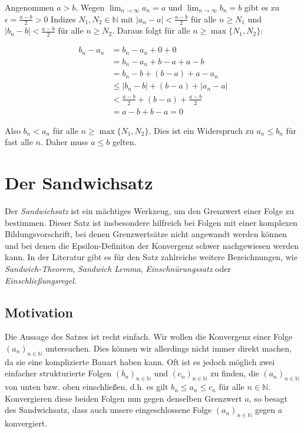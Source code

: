 \documentclass[fontsize=9pt,
               parskip=half-,
               DIV=14,
               listof=chapterentry,
               tocflat]{scrbook}
\begin{document}
\begin{proof*}
Angenommen $a>b$. Wegen $\lim _{n\to \infty }a_{n}=a$ und $\lim _{n\to \infty }b_{n}=b$ gibt es zu $\epsilon ={\tfrac {a-b}{2}}>0$ Indizes $N_{1},N_{2}\in \mathbb {N} $ mit $|a_{n}-a|<{\tfrac {a-b}{2}}$ für alle $n\geq N_{1}$ und $|b_{n}-b|<{\tfrac {a-b}{2}}$ für alle $n\geq N_{2}$. Daraus folgt für alle $n\geq \max\{N_{1},N_{2}\}$:

\begin{align*}
b_{n}-a_{n}&=b_{n}-a_{n}+0+0\\&=b_{n}-a_{n}+b-a+a-b\\&=b_{n}-b+(b-a)+a-a_{n}\\&\leq |b_{n}-b|+(b-a)+|a_{n}-a|\\&<{\tfrac {a-b}{2}}+(b-a)+{\tfrac {a-b}{2}}\\&=a-b+b-a=0
\end{align*}

Also $b_{n}<a_{n}$ für alle $n\geq \max\{N_{1},N_{2}\}$. Dies ist ein Widerspruch zu $a_{n}\leq b_{n}$ für fast alle $n$. Daher muss $a\leq b$ gelten.

\end{proof*}

\chapter{Der Sandwichsatz}

Der \emph{Sandwichsatz} ist ein mächtiges Werkzeug, um den Grenzwert einer Folge zu bestimmen. Dieser Satz ist insbesondere hilfreich bei Folgen mit einer komplexen Bildungsvorschrift, bei denen Grenzwertsätze nicht angewandt werden können und bei denen die Epsilon-Definiton der Konvergenz schwer nachgewiesen werden kann. In der Literatur gibt es für den Satz zahlreiche weitere Bezeichnungen, wie \emph{Sandwich-Theorem}, \emph{Sandwich Lemma}, \emph{Einschnürungssatz} oder \emph{Einschließungsregel}.

\section{Motivation}

Die Aussage des Satzes ist recht einfach. Wir wollen die Konvergenz einer Folge $(a_{n})_{n\in \mathbb {N} }$ untersuchen. Dies können wir allerdings nicht immer direkt machen, da sie eine komplizierte Bauart haben kann. Oft ist es jedoch möglich zwei einfacher strukturierte Folgen $(b_{n})_{n\in \mathbb {N} }$ und $(c_{n})_{n\in \mathbb {N} }$ zu finden, die $(a_{n})_{n\in \mathbb {N} }$ von unten bzw. oben einschließen, d.h. es gilt $b_{n}\leq a_{n}\leq c_{n}$ für alle $n\in \mathbb {N} $. Konvergieren diese beiden Folgen nun gegen denselben Grenzwert $a$, so besagt des Sandwichsatz, dass auch unsere eingeschlossene Folge $(a_{n})_{n\in \mathbb {N} }$ gegen $a$ konvergiert.
\end{document}
